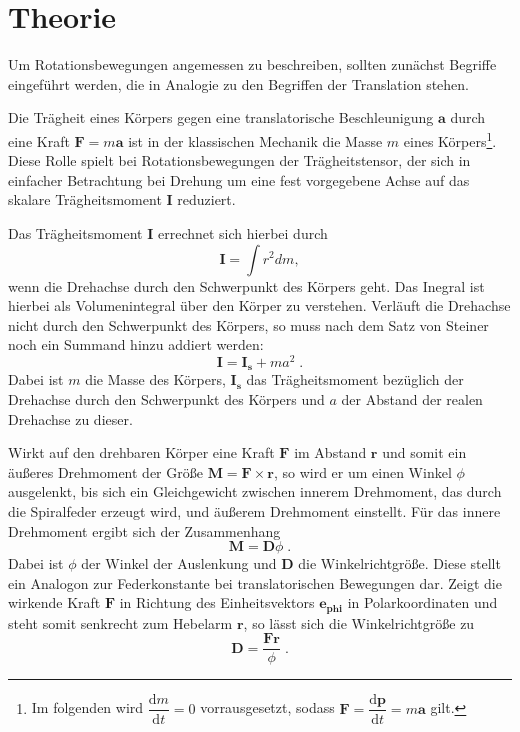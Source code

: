 \section{Theorie}
\label{sec:Theorie}
Um Rotationsbewegungen angemessen zu beschreiben, sollten zunächst Begriffe
eingeführt werden, die in Analogie zu den Begriffen der Translation stehen.

Die Trägheit eines Körpers gegen eine translatorische Beschleunigung $\symbf{a}$
durch eine Kraft $\symbf{F}=m\symbf{a}$ ist in der klassischen Mechanik die
Masse $m$ eines Körpers\footnote{Im folgenden wird
$\dfrac{\mathrm{d}m}{\mathrm{d}t}=0$ vorrausgesetzt, sodass
$\symbf{F}=\dfrac{\mathrm{d}\symbf{p}}{\mathrm{d}t}=m\symbf{a}$ gilt.}.
Diese Rolle spielt bei Rotationsbewegungen der Trägheitstensor, der sich in
einfacher Betrachtung bei Drehung um eine fest vorgegebene Achse auf das skalare
Trägheitsmoment $\symbf{I}$ reduziert.

Das Trägheitsmoment $\symbf{I}$ errechnet sich hierbei durch
\begin{equation}
  \symbf{I}=\int r^2 dm  ,
  \label{eqn:traegheitallg}
\end{equation}
wenn die Drehachse durch den Schwerpunkt des Körpers geht. Das Inegral ist hierbei
als Volumenintegral über den Körper zu verstehen. Verläuft die Drehachse nicht
durch den Schwerpunkt des Körpers, so muss nach dem Satz von Steiner noch ein
Summand hinzu addiert werden:
\begin{equation}
  \symbf{I}=\symbf{I_s}+ma^2\;.
  \label{eqn:steiner}
\end{equation}
Dabei ist $m$ die Masse des Körpers, $\symbf{I_s}$ das Trägheitsmoment bezüglich
der Drehachse durch den Schwerpunkt des Körpers und $a$ der Abstand der realen
Drehachse zu dieser.

Wirkt auf den drehbaren Körper eine Kraft $\symbf{F}$ im Abstand $\symbf{r}$ und somit ein
äußeres Drehmoment der Größe $\symbf{M}=\symbf{F}\times\symbf{r}$, so wird er um
einen Winkel $\phi$ ausgelenkt, bis sich ein Gleichgewicht zwischen innerem Drehmoment,
das durch die Spiralfeder erzeugt wird, und äußerem Drehmoment einstellt. Für das innere
Drehmoment ergibt sich der Zusammenhang
\begin{equation}
  \symbf{M}=\symbf{D}\phi\;.
  \label{eqn:drehmoment_innen}
\end{equation}
Dabei ist $\phi$ der Winkel der Auslenkung und $\symbf{D}$ die Winkelrichtgröße.
Diese stellt ein Analogon zur Federkonstante bei translatorischen Bewegungen dar.
Zeigt die wirkende Kraft $\symbf{F}$ in Richtung des Einheitsvektors $\symbf{e_{phi}}$
in Polarkoordinaten und steht somit senkrecht zum Hebelarm $\symbf{r}$, so lässt sich
die Winkelrichtgröße zu
\begin{equation}
  \symbf{D}=\frac{\symbf{F}\symbf{r}}{\phi}\;.
  \label{eqn:winkelrg}
\end{equation}

